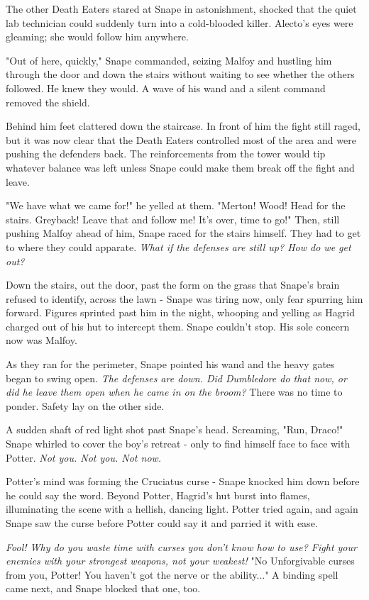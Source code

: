\documentclass[a4paper,11pt]{article}
\begin{document}
The other Death Eaters stared at Snape in astonishment, shocked that the quiet lab technician could suddenly turn into a cold-blooded killer. Alecto's eyes were gleaming; she would follow him anywhere.

"Out of here, quickly," Snape commanded, seizing Malfoy and hustling him through the door and down the stairs without waiting to see whether the others followed. He knew they would. A wave of his wand and a silent command removed the shield.

Behind him feet clattered down the staircase. In front of him the fight still raged, but it was now clear that the Death Eaters controlled most of the area and were pushing the defenders back. The reinforcements from the tower would tip whatever balance was left unless Snape could make them break off the fight and leave.

"We have what we came for!" he yelled at them. "Merton! Wood! Head for the stairs. Greyback! Leave that and follow me! It's over, time to go!" Then, still pushing Malfoy ahead of him, Snape raced for the stairs himself. They had to get to where they could apparate. \emph{What if the defenses are still up? How do we get out?}

Down the stairs, out the door, past the form on the grass that Snape's brain refused to identify, across the lawn - Snape was tiring now, only fear spurring him forward. Figures sprinted past him in the night, whooping and yelling as Hagrid charged out of his hut to intercept them. Snape couldn't stop. His sole concern now was Malfoy.

As they ran for the perimeter, Snape pointed his wand and the heavy gates began to swing open. \emph{The defenses are down. Did Dumbledore do that now, or did he leave them open when he came in on the broom?} There was no time to ponder. Safety lay on the other side.

A sudden shaft of red light shot past Snape's head. Screaming, "Run, Draco!" Snape whirled to cover the boy's retreat - only to find himself face to face with Potter. \emph{Not you. Not you. Not now.}

Potter's mind was forming the Cruciatus curse - Snape knocked him down before he could say the word. Beyond Potter, Hagrid's hut burst into flames, illuminating the scene with a hellish, dancing light. Potter tried again, and again Snape saw the curse before Potter could say it and parried it with ease.

\emph{Fool! Why do you waste time with curses you don't know how to use? Fight your enemies with your strongest weapons, not your weakest!} "No Unforgivable curses from you, Potter! You haven't got the nerve or the ability..." A binding spell came next, and Snape blocked that one, too.
\end{document}
